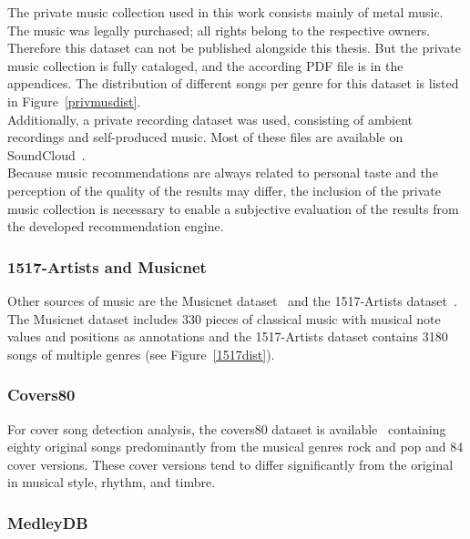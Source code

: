 The private music collection used in this work consists mainly of metal music. The music was legally purchased; all rights belong to the respective owners. Therefore this dataset can not be published alongside this thesis. But the private music collection is fully cataloged, and the according PDF file is in the appendices. The distribution of different songs per genre for this dataset is listed in Figure~\ref{privmusdist}.\\
\noindent Additionally, a private recording dataset was used, consisting of ambient recordings and self-produced music. Most of these files are available on SoundCloud~\cite{bqpd1}.\\
Because music recommendations are always related to personal taste and the perception of the quality of the results may differ, the inclusion of the private music collection is necessary to enable a subjective evaluation of the results from the developed recommendation engine.

\subsubsection{1517-Artists and Musicnet}

Other sources of music are the Musicnet dataset~\cite{musicnet1} and the 1517-Artists dataset~\cite{1517artists1}. The Musicnet dataset includes 330 pieces of classical music with musical note values and positions as annotations and the 1517-Artists dataset contains 3180 songs of multiple genres (see Figure~\ref{1517dist}). 

\subsubsection{Covers80}\label{cov801}

For cover song detection analysis, the covers80 dataset is available~\cite{cover80} containing eighty original songs predominantly from the musical genres rock and pop and 84 cover versions. These cover versions tend to differ significantly from the original in musical style, rhythm, and timbre.

\subsubsection{MedleyDB}

